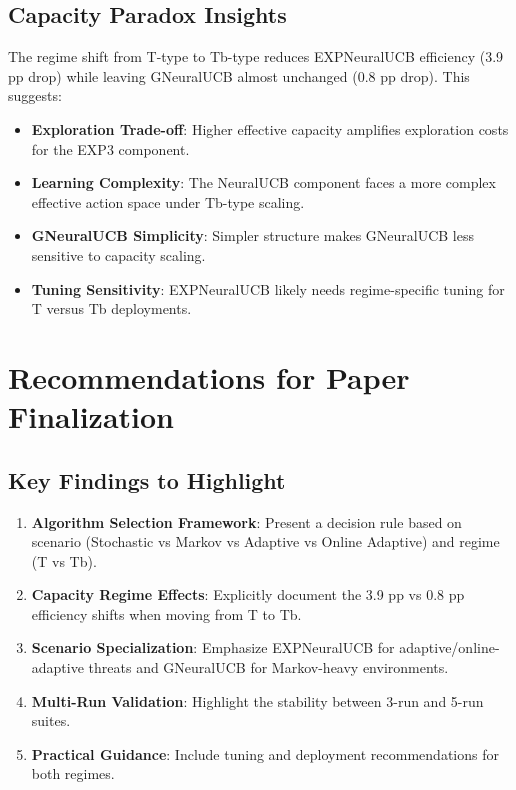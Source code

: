 \documentclass[11pt,a4paper]{article}
\begin{document}
\subsection{Capacity Paradox Insights}

The regime shift from T-type to Tb-type reduces EXPNeuralUCB efficiency (3.9 pp drop) while leaving GNeuralUCB almost unchanged (0.8 pp drop). This suggests:

\begin{itemize}
\item \textbf{Exploration Trade-off}: Higher effective capacity amplifies exploration costs for the EXP3 component.
\item \textbf{Learning Complexity}: The NeuralUCB component faces a more complex effective action space under Tb-type scaling.
\item \textbf{GNeuralUCB Simplicity}: Simpler structure makes GNeuralUCB less sensitive to capacity scaling.
\item \textbf{Tuning Sensitivity}: EXPNeuralUCB likely needs regime-specific tuning for T versus Tb deployments.
\end{itemize}

\section{Recommendations for Paper Finalization}

\subsection{Key Findings to Highlight}

\begin{enumerate}
\item \textbf{Algorithm Selection Framework}: Present a decision rule based on scenario (Stochastic vs Markov vs Adaptive vs Online Adaptive) and regime (T vs Tb).
\item \textbf{Capacity Regime Effects}: Explicitly document the 3.9 pp vs 0.8 pp efficiency shifts when moving from T to Tb.
\item \textbf{Scenario Specialization}: Emphasize EXPNeuralUCB for adaptive/online-adaptive threats and GNeuralUCB for Markov-heavy environments.
\item \textbf{Multi-Run Validation}: Highlight the stability between 3-run and 5-run suites.
\item \textbf{Practical Guidance}: Include tuning and deployment recommendations for both regimes.
\end{enumerate}
\end{document}
